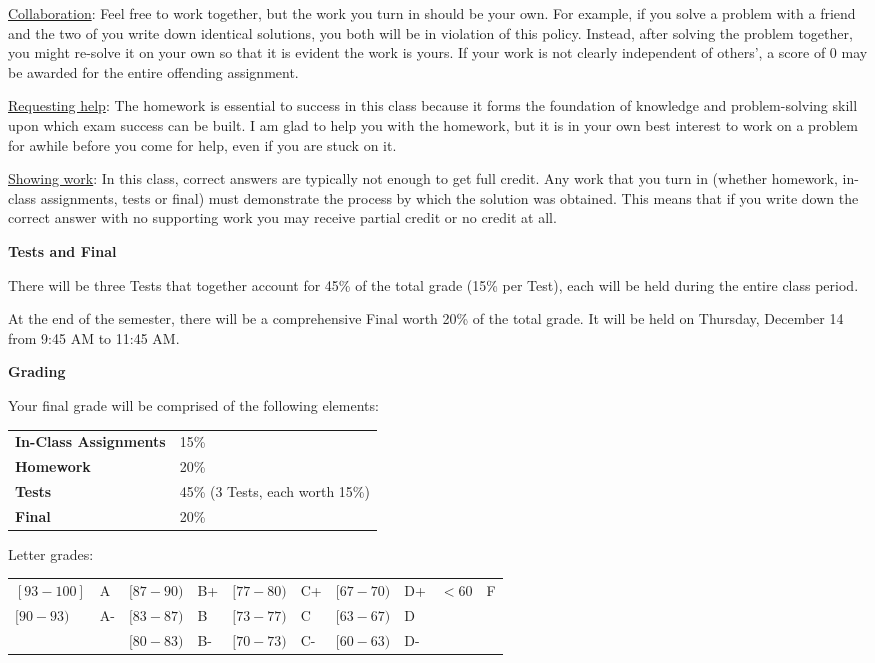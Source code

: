 \documentclass{article}
\begin{document}
\ul{Collaboration}: Feel free to work together, but the work you turn in should be your own. For example, if you solve a problem with a friend and the two of you write down identical solutions, you both will be in violation of this policy. Instead, after solving the problem together, you might re-solve it on your own so that it is evident the work is yours. If your work is not clearly independent of others', a score of 0 may be awarded for the entire offending assignment.\medskip

\ul{Requesting help}: The homework is essential to success in this class because it forms the foundation of knowledge and problem-solving skill upon which exam success can be built. I am glad to help you with the homework, but it is in your own best interest to work on a problem for awhile before you come for help, even if you are stuck on it.\medskip

\ul{Showing work}: In this class, correct answers are typically not enough to get full credit. Any work that you turn in (whether homework, in-class assignments, tests or final) must demonstrate the process by which the solution was obtained. This means that if you write down the correct answer with no supporting work you may receive partial credit or no credit at all.\bigskip

\textbf{\large Tests and Final}\medskip

There will be three Tests that together account for 45\% of the total grade (15\% per Test), each will be held during the entire class period.

At the end of the semester, there will be a comprehensive Final worth 20\% of the total grade. It will be held on Thursday, December 14 from 9:45 AM to 11:45 AM.\bigskip

\textbf{\large Grading}\medskip

Your final grade will be comprised of the following elements:\bigskip\\
\begin{tabular}{ll}
    \textbf{In-Class Assignments} & 15\%\\
    \textbf{Homework} & 20\%\\
    \textbf{Tests} & 45\% (3 Tests, each worth 15\%)\\
    \textbf{Final} & 20\% 
\end{tabular}\medskip

Letter grades:\bigskip\\
\begin{tabular}{ll | ll | ll | ll | ll}
    \hline
    $[93 - 100]$ & A & $[87 - 90)$ & B+ & $[77 - 80)$ & C+ & $[67 - 70)$ & D+ & $< 60$ & F\\
    $[90 - 93)$ & A-  & $[83 - 87)$ & B & $[73 - 77)$ & C & $[63 - 67)$ & D & \\
     & & $[80 - 83)$ & B- & $[70 - 73)$ & C- & $[60 - 63)$ & D- & \\
    \hline
\end{tabular}
\end{document}
